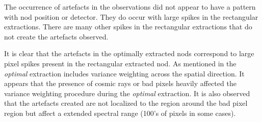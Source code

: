 The occurrence of artefacts in the observations did not appear to have a pattern with nod position or detector. They do occur with large spikes in the rectangular extractions. There are many other spikes in the rectangular extractions that do not create the artefacts observed.

It is clear that the artefacts in the optimally extracted nods correspond to large pixel spikes present in the rectangular extracted nod. As mentioned in  the \emph{optimal} extraction includes variance weighting across the spatial direction. It appears that the presence of cosmic rays or bad pixels heavily affected the variance weighting procedure during the \emph{optimal} extraction. It is also observed that the artefacts created are not localized to the region around the bad pixel region but affect a extended spectral range (100's of pixels in some cases).

